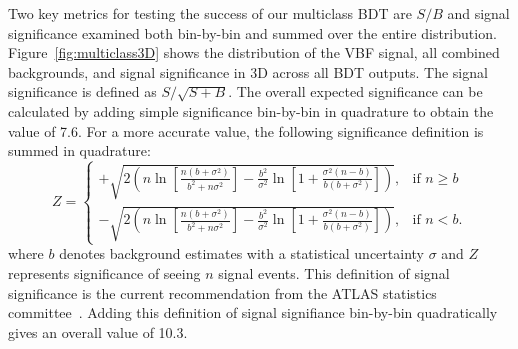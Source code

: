 Two key metrics for testing the success of our multiclass BDT are $S/B$ and signal significance examined both bin-by-bin and summed over the entire distribution. Figure~\ref{fig:multiclass3D} shows the distribution of the VBF signal, all combined backgrounds, and signal significance in 3D across all BDT outputs. The signal significance is defined as $S/\sqrt{S+B}$. The overall expected significance can be calculated by adding simple significance bin-by-bin in quadrature to obtain the value of 7.6. For a more accurate value, the following significance definition is summed in quadrature:
\[
    Z = 
\begin{cases}
    +\sqrt{2(n\ln[\frac{n(b+\sigma^2)}{b^2+n\sigma^2}]-\frac{b^2}{\sigma^2}\ln[1+\frac{\sigma^2(n-b)}{b(b+\sigma^2)}])},& \text{if } n\geq b\\
    -\sqrt{2(n\ln[\frac{n(b+\sigma^2)}{b^2+n\sigma^2}]-\frac{b^2}{\sigma^2}\ln[1+\frac{\sigma^2(n-b)}{b(b+\sigma^2)}])},& \text{if } n<b .
\end{cases}
\] 
where $b$ denotes background estimates with a statistical uncertainty $\sigma$ and $Z$ represents significance of seeing $n$ signal events. This definition of signal significance is the current recommendation from the ATLAS statistics committee~\cite{Berger:2285058}. Adding this definition of signal signifiance bin-by-bin quadratically gives an overall value of 10.3.

